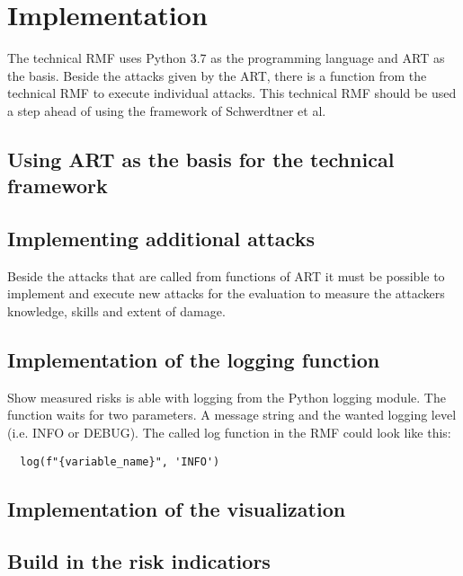 \section{Implementation}
\label{sec:implementation}

The technical RMF uses Python 3.7 as the programming language and ART as the basis. Beside the attacks given by the ART, there is a function from the technical RMF to execute individual attacks. This technical RMF should be used a step ahead of using the framework of Schwerdtner et al.

\subsection{Using ART as the basis for the technical framework}

\subsection{Implementing additional attacks}

Beside the attacks that are called from functions of ART it must be possible to implement and execute new attacks for the evaluation to measure the attackers knowledge, skills and extent of damage.

\subsection{Implementation of the logging function}

Show measured risks is able with logging from the Python logging module. The function waits for two parameters. A message string and the wanted logging level (i.e. INFO or DEBUG). The called log function in the RMF could look like this:
\begin{lstlisting}
  log(f"{variable_name}", 'INFO')
\end{lstlisting}

\subsection{Implementation of the visualization}

\subsection{Build in the risk indicatiors}

